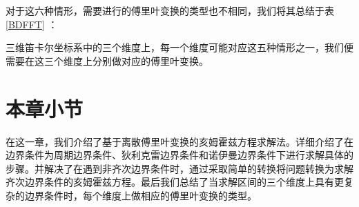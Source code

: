 对于这六种情形，需要进行的傅里叶变换的类型也不相同，我们将其总结于表 \ref{BDFFT} ：  
\begin{table}[H]
\centering %
\caption{不同边界条件对应的傅里叶变换}
\label{BDFFT}
\end{table}  

三维笛卡尔坐标系中的三个维度上，每一个维度可能对应这五种情形之一，我们便需要在这三个维度上分别做对应的傅里叶变换。  

\section{本章小节}
在这一章，我们介绍了基于离散傅里叶变换的亥姆霍兹方程求解法。详细介绍了在边界条件为周期边界条件、狄利克雷边界条件和诺伊曼边界条件下进行求解具体的步骤。并解决了在遇到非齐次边界条件时，通过采取简单的转换将问题转换为求解齐次边界条件的亥姆霍兹方程。最后我们总结了当求解区间的三个维度上具有更复杂的边界条件时，每个维度上做相应的傅里叶变换的类型。








